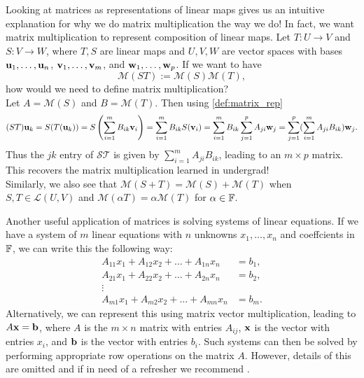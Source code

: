 \documentclass{article}
\begin{document}
Looking at matrices as representations of linear maps gives us an intuitive explanation for why we do matrix multiplication the way we do! In fact, we want matrix multiplication to represent composition of linear maps. 
Let $T: U \to V$ and $S:V \to W$, where $T, S$ are linear maps and $U,V,W$ are vector spaces with bases ${\mathbf{u}}_1, \ldots, {\mathbf{u}}_n$, ${\mathbf{v}}_1, \ldots, {\mathbf{v}}_m$, and ${\mathbf{w}}_1, \ldots, {\mathbf{w}}_p$. If we want to have 
\begin{equation*}
    \mathcal{M}(ST) := \mathcal{M}(S) \mathcal{M}(T),
\end{equation*}
how would we need to define matrix multiplication? \\
Let $A = \mathcal{M}(S)$ and $B = \mathcal{M}(T)$. Then using \cref{def:matrix_rep}
\begin{align*}
    (ST){\mathbf{u}}_k = S(T({\mathbf{u}}_k)) = S\left(\sum_{i=1}^m B_{ik}{\mathbf{v}}_i\right) = \sum_{i=1}^m B_{ik} S({\mathbf{v}}_i)= \sum_{i=1}^m B_{ik} \sum_{j=1}^p A_{ji} {\mathbf{w}}_j =\sum_{j=1}^p (\sum_{i=1}^m A_{ji} B_{ik}) {\mathbf{w}}_j.
\end{align*}
Thus the $jk$ entry of $\mathcal{ST}$ is given by $\sum_{i=1}^m A_{ji} B_{ik}$, leading to an $m\times p$ matrix. This recovers the matrix multiplication learned in undergrad!\\
Similarly, we also see that $\mathcal{M}(S+T) = \mathcal{M}(S) + \mathcal{M}(T)$ when $S,T \in \mathcal{L}(U,V)$ and $\mathcal{M}(\alpha T) = \alpha \mathcal{M}(T)$ for $\alpha \in {\mathbb{F}}$.

Another useful application of matrices is solving systems of linear equations. If we have a system of $m$ linear equations with $n$ unknowns $x_1,\ldots, x_n$ and coeffcients in ${\mathbb{F}}$, we can write this the following way:
\begin{align*}
    A_{11} x_1 + A_{12}x_2 + \ldots + A_{1n}x_n &= b_1,\\
     A_{21} x_1 + A_{22}x_2 + \ldots + A_{2n}x_n &= b_2,\\
     \vdots& \\
      A_{m1} x_1 + A_{m2}x_2 + \ldots + A_{mn}x_n &= b_m.
\end{align*}
Alternatively, we can represent this using matrix vector multiplication, leading to $A\bold{x} = \bold{b}$, where $A$ is the $m\times n$ matrix with entries $A_{ij}$, $\bold{x}$ is the vector with entries $x_i$, and $\bold{b}$ is the vector with entries $b_i$. Such systems can then be solved by performing appropriate row operations on the matrix $A$. However, details of this are omitted and if in need of a refresher we recommend \cite[Chapter 2]{linalgwrong}.
\end{document}
